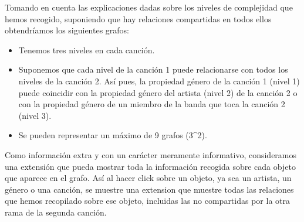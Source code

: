 Tomando en cuenta las explicaciones dadas sobre los niveles de complejidad que hemos recogido, suponiendo que hay relaciones compartidas en todos ellos obtendríamos los siguientes grafos:

\begin{itemize}
  \item Tenemos tres niveles en cada canción.
  \item Suponemos que cada nivel de la canción 1 puede relacionarse con todos los niveles de la canción 2. Así pues, la propiedad género de la canción 1 (nivel 1) puede coincidir con la propiedad género del artista (nivel 2) de la canción 2 o con la propiedad género de un miembro de la banda que toca la canción 2 (nivel 3).
  \item Se pueden representar un máximo de 9 grafos (3\^{}2).
\end{itemize}

Como información extra y con un carácter meramente informativo, consideramos una extensión que pueda mostrar toda la información recogida sobre cada objeto que aparece en el grafo. Así al hacer click sobre un objeto, ya sea un artista, un género o una canción, se muestre una extension que muestre todas las relaciones que hemos recopilado sobre ese objeto, incluidas las no compartidas por la otra rama de la segunda canción.